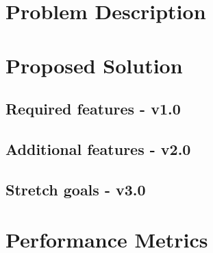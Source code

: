 \documentclass[onecolumn, draftclsnofoot,10pt, compsoc]{IEEEtran}
\begin{document}
\clearpage
\singlespace


	\section*{Problem Description}

	\section*{Proposed Solution}

	\subsection*{Required features - v1.0}

	\subsection*{Additional features - v2.0}

	\subsection*{Stretch goals - v3.0}

	\section*{Performance Metrics}
\end{document}
